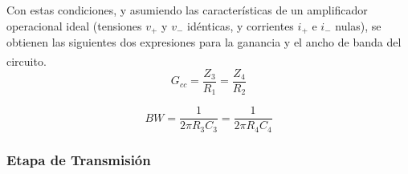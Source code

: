 Con estas condiciones, y asumiendo las características de un amplificador operacional ideal (tensiones $v_+$ y $v_-$ idénticas, y corrientes $i_+$ e $i_-$ nulas), se obtienen las siguientes dos expresiones para la ganancia y el ancho de banda del circuito.\textsuperscript{\cite{Caravelli-Irusta}\cite{DifferenceAmps}}\\

\begin{equation}
    G_{cc} = \frac{Z_3}{R_1} = \frac{Z_4}{R_2}
\end{equation}

\begin{equation}
    BW = \frac{1}{2\pi R_3C_3} = \frac{1}{2\pi R_4C_4}
\end{equation}

\subsubsection{Etapa de Transmisión}

\lipsum[2]\\

\lipsum[3]\\